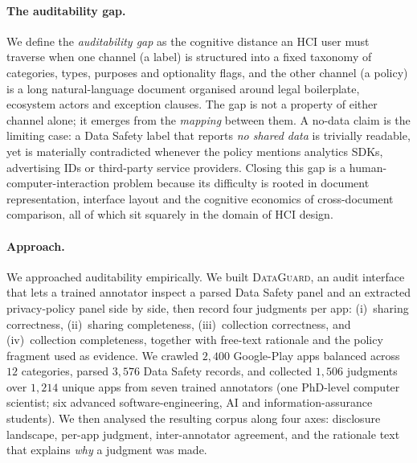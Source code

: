 \documentclass[11pt,a4paper]{article}
\newcommand{\dataguard}{\textsc{DataGuard}}
\begin{document}
\paragraph{The auditability gap.}
We define the \emph{auditability gap} as the cognitive distance an HCI user
must traverse when one channel (a label) is structured into a fixed taxonomy
of categories, types, purposes and optionality flags, and the other channel
(a policy) is a long natural-language document organised around legal
boilerplate, ecosystem actors and exception clauses. The gap is not a
property of either channel alone; it emerges from the \emph{mapping} between
them. A no-data claim is the limiting case: a Data Safety label that reports
\emph{no shared data} is trivially readable, yet is materially contradicted
whenever the policy mentions analytics SDKs, advertising IDs or third-party
service providers. Closing this gap is a human-computer-interaction problem
because its difficulty is rooted in document representation, interface
layout and the cognitive economics of cross-document comparison, all of which
sit squarely in the domain of HCI design.

\paragraph{Approach.}
We approached auditability empirically. We built \dataguard, an audit
interface that lets a trained annotator inspect a parsed Data Safety panel
and an extracted privacy-policy panel side by side, then record four
judgments per app: (i)~sharing correctness, (ii)~sharing completeness,
(iii)~collection correctness, and (iv)~collection completeness, together
with free-text rationale and the policy fragment used as evidence. We
crawled $2{,}400$ Google-Play apps balanced across $12$ categories, parsed
$3{,}576$ Data Safety records, and collected $1{,}506$ judgments over
$1{,}214$ unique apps from seven trained annotators (one PhD-level computer
scientist; six advanced software-engineering, AI and information-assurance
students). We then analysed the resulting corpus along four axes:
disclosure landscape, per-app judgment, inter-annotator agreement, and the
rationale text that explains \emph{why} a judgment was made.
\end{document}
